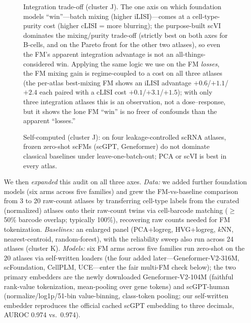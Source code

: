\documentclass[11pt]{article}
\begin{document}
\begin{figure}[htb]\centering
\caption{Integration trade-off (cluster J). The one axis on which foundation models ``win''---batch mixing (higher iLISI)---comes at a cell-type-purity cost (higher cLISI = more blurring); the purpose-built scVI dominates the mixing/purity trade-off (strictly best on both axes for B-cells, and on the Pareto front for the other two atlases), so even the FM's apparent integration advantage is not an all-things-considered win. Applying the same logic we use on the FM \emph{losses}, the FM mixing gain is regime-coupled to a cost on all three atlases (the per-atlas best-mixing FM shows an iLISI advantage $+0.6$/$+1.1$/$+2.4$ each paired with a cLISI cost $+0.1$/$+3.1$/$+1.5$); with only three integration atlases this is an observation, not a dose--response, but it shows the lone FM ``win'' is no freer of confounds than the apparent ``losses.''}\label{fig:integ}\end{figure}

\begin{figure}[htb]\centering
\caption{Self-computed (cluster J): on four leakage-controlled scRNA atlases, frozen zero-shot scFMs (scGPT, Geneformer) do not dominate classical baselines under leave-one-batch-out; PCA or scVI is best in every atlas.}\label{fig:scrnalobo}\end{figure}

We then \emph{expanded} this audit on all three axes. \emph{Data:} we added further foundation models (six arms across five families) and grew the FM-vs-baseline comparison from 3 to 20 raw-count atlases by transferring cell-type labels from the curated (normalized) atlases onto their raw-count twins via cell-barcode matching ($\geq$50\% barcode overlap; typically 100\%), recovering raw counts needed for FM tokenization. \emph{Baselines:} an enlarged panel (PCA+logreg, HVG+logreg, $k$NN, nearest-centroid, random-forest), with the reliability sweep also run across 24 atlases (cluster K). \emph{Models:} six FM arms across five families run zero-shot on the 20 atlases via self-written loaders (the four added later---Geneformer-V2-316M, scFoundation, CellPLM, UCE---enter the fair multi-FM check below); the two primary embedders are the newly downloaded Geneformer-V2-104M (faithful rank-value tokenization, mean-pooling over gene tokens) and scGPT-human (normalize/log1p/51-bin value-binning, class-token pooling; our self-written embedder reproduces the official cached scGPT embedding to three decimals, AUROC 0.974 vs.\ 0.974).
\end{document}
